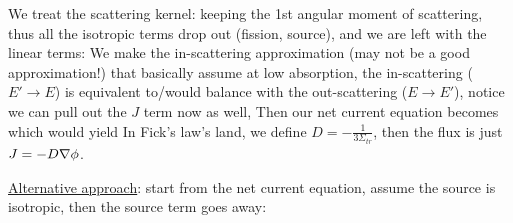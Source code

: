 \documentclass{school-22.211-notes}
\begin{document}
\clearpage
{}
We treat the scattering kernel: keeping the 1st angular moment of scattering, thus all the isotropic terms drop out (fission, source), and we are left with the linear terms: 
We make the in-scattering approximation (may not be a good approximation!) that basically assume at low absorption, the in-scattering ($E'\to E$) is equivalent to/would balance with the out-scattering ($E \to E'$), notice we can pull out the $J$ term now as well,  
Then our net current equation becomes
which would yield
In Fick's law's land, we define $\displaystyle D = - \frac{1}{3 \Sigma_{tr}}$, then the flux is just $J = - D \nabla \phi$. 



\uline{Alternative approach}: start from the net current equation, assume the source is isotropic, then the source term goes away:
\end{document}
